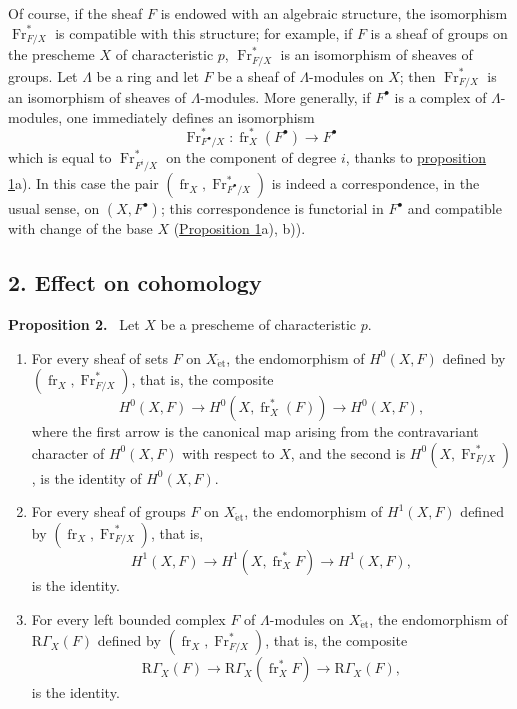 \documentclass[11pt]{article}
\newenvironment{statement}[1]{\par\medskip\noindent\textbf{#1.}\ }{\par\medskip}
\providecommand{\et}{\mathrm{\acute{e}t}}
\providecommand{\RGamma}{\mathrm R\Gamma}
\providecommand{\RGamma}{\mathrm R\Gamma}
\providecommand{\fr}{\operatorname{fr}}
\providecommand{\Fr}{\operatorname{Fr}}
\providecommand{\Fr}{\operatorname{Fr}}
\providecommand{\fr}{\operatorname{fr}}
\providecommand{\RGamma}{\mathrm R\Gamma}
\providecommand{\et}{\acute{e}t}
\begin{document}
Of course, if the sheaf $F$ is endowed with an algebraic structure, the isomorphism $\Fr^*_{F/X}$ is compatible with this structure; for example, if $F$ is a sheaf of groups on the prescheme $X$ of characteristic $p$, $\Fr^*_{F/X}$ is an isomorphism of sheaves of groups. Let $\Lambda$ be a ring and let $F$ be a sheaf of $\Lambda$-modules on $X$; then $\Fr^*_{F/X}$ is an isomorphism of sheaves of $\Lambda$-modules. More generally, if $F^\bullet$ is a complex of $\Lambda$-modules, one immediately defines an isomorphism
\[
\Fr^*_{F^\bullet/X}:\fr_X^*(F^\bullet)\longrightarrow F^\bullet
\]
which is equal to $\Fr^*_{F^i/X}$ on the component of degree $i$, thanks to \hyperref[sga5:XV:proposition:1:2]{proposition 1}a). In this case the pair $(\fr_X,\Fr^*_{F^\bullet/X})$ is indeed a correspondence, in the usual sense, on $(X,F^\bullet)$; this correspondence is functorial in $F^\bullet$ and compatible with change of the base $X$ (\hyperref[sga5:XV:proposition:1:2]{Proposition 1}a), b)).

\subsection*{2. Effect on cohomology}\label{sga5:XV:subsection:2}

\label{sga5:XV:proposition:2:2}\begin{statement}{Proposition 2}
Let $X$ be a prescheme of characteristic $p$.
\begin{enumerate}[label=\alph*)]
\item For every sheaf of sets $F$ on $X_{\et}$, the endomorphism of $H^0(X,F)$ defined by $(\fr_X,\Fr^*_{F/X})$, that is, the composite
\[
H^0(X,F)\longrightarrow H^0(X,\fr_X^*(F))\longrightarrow H^0(X,F),
\]
where the first arrow is the canonical map arising from the contravariant character of $H^0(X,F)$ with respect to $X$, and the second is $H^0(X,\Fr^*_{F/X})$, is the identity of $H^0(X,F)$.
\item For every sheaf of groups $F$ on $X_{\et}$, the endomorphism of $H^1(X,F)$ defined by $(\fr_X,\Fr^*_{F/X})$, that is,
\[
H^1(X,F)\longrightarrow H^1(X,\fr_X^*F)\longrightarrow H^1(X,F),
\]
is the identity.
\item For every left bounded complex $F$ of $\Lambda$-modules on $X_{\et}$, the endomorphism of $\RGamma_X(F)$ defined by $(\fr_X,\Fr^*_{F/X})$, that is, the composite
\[
\RGamma_X(F)\longrightarrow \RGamma_X(\fr_X^*F)\longrightarrow \RGamma_X(F),
\]
is the identity.
\end{enumerate}
\end{statement}
\end{document}
